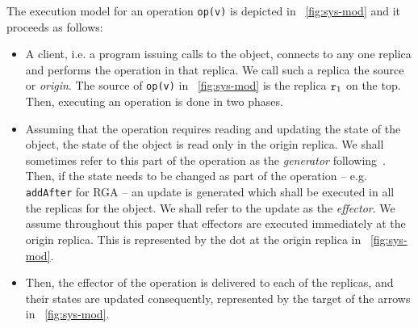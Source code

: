 The execution model for an operation \lstinline|op(v)| is depicted in \figureautorefname~\ref{fig:sys-mod} and it proceeds as follows:
\begin{itemize}
\item A client, i.e. a program issuing calls to the object, connects
  to any one replica %
  and performs the operation in that replica. We call such a
  replica the source or \emph{origin}. The source of \lstinline|op(v)|
  in \figureautorefname~\ref{fig:sys-mod} is the replica $\mathtt{r}_1$ on the top.
  Then, executing an operation is done in two phases.
\item Assuming that the operation requires reading and updating the
  state of the object, the state of the object is read only in the origin replica.
  We shall sometimes refer to this part of the operation as the
  \emph{generator} following~\cite{ShapiroPBZ11}.
  Then, if the state needs to be changed as part of the operation --
  e.g. \lstinline|addAfter| for RGA -- an update is
  generated which shall be executed in all the replicas for the
  object.
  We shall refer to the update as the \emph{effector}.
  We assume throughout this paper that effectors are executed
  immediately at the origin replica.
  This is represented by the dot at the origin replica
  in \figureautorefname~\ref{fig:sys-mod}.
\item Then, the effector of the operation is delivered to each of the
  replicas, and their states are updated consequently, represented by
  the target of the arrows in \figureautorefname~\ref{fig:sys-mod}.
\end{itemize}

